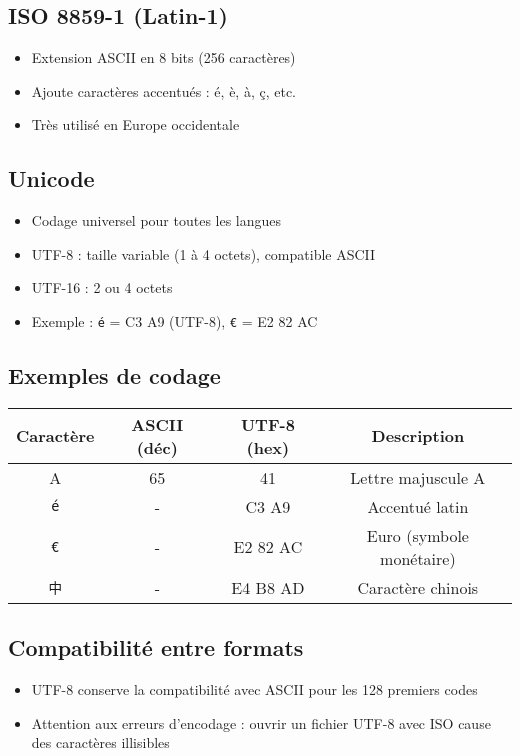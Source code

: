 \documentclass[12pt,a4paper]{article}
\begin{document}
\subsection{ISO 8859-1 (Latin-1)}
\begin{itemize}
  \item Extension ASCII en 8 bits (256 caractères)
  \item Ajoute caractères accentués : é, è, à, ç, etc.
  \item Très utilisé en Europe occidentale
\end{itemize}

\subsection{Unicode}
\begin{itemize}
  \item Codage universel pour toutes les langues
  \item UTF-8 : taille variable (1 à 4 octets), compatible ASCII
  \item UTF-16 : 2 ou 4 octets
  \item Exemple : \texttt{é} = C3 A9 (UTF-8), \texttt{€} = E2 82 AC
\end{itemize}

\subsection{Exemples de codage}
\begin{tabular}{|c|c|c|c|}
\hline
Caractère & ASCII (déc) & UTF-8 (hex) & Description \\
\hline
A & 65 & 41 & Lettre majuscule A \\
\texttt{é} & - & C3 A9 & Accentué latin \\
\texttt{€} & - & E2 82 AC & Euro (symbole monétaire) \\
\texttt{中} & - & E4 B8 AD & Caractère chinois \\
\hline
\end{tabular}

\subsection{Compatibilité entre formats}
\begin{itemize}
  \item UTF-8 conserve la compatibilité avec ASCII pour les 128 premiers codes
  \item Attention aux erreurs d'encodage : ouvrir un fichier UTF-8 avec ISO cause des caractères illisibles
\end{itemize}
\end{document}
